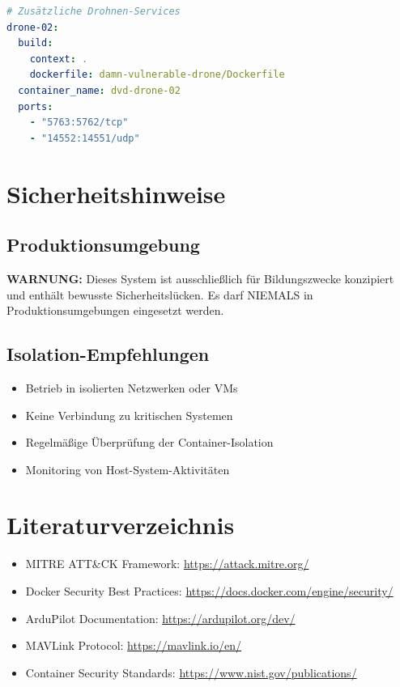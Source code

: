 \documentclass[11pt,a4paper]{article}
\begin{document}
\begin{lstlisting}[language=yaml, caption=Erweiterte Drohnen-Flotte]
# Zusätzliche Drohnen-Services
drone-02:
  build:
    context: .
    dockerfile: damn-vulnerable-drone/Dockerfile
  container_name: dvd-drone-02
  ports:
    - "5763:5762/tcp"
    - "14552:14551/udp"
\end{lstlisting}

\section{Sicherheitshinweise}

\subsection{Produktionsumgebung}

\textbf{WARNUNG:} Dieses System ist ausschließlich für Bildungszwecke konzipiert und enthält bewusste Sicherheitslücken. Es darf NIEMALS in Produktionsumgebungen eingesetzt werden.

\subsection{Isolation-Empfehlungen}

\begin{itemize}
    \item Betrieb in isolierten Netzwerken oder VMs
    \item Keine Verbindung zu kritischen Systemen
    \item Regelmäßige Überprüfung der Container-Isolation
    \item Monitoring von Host-System-Aktivitäten
\end{itemize}

\section{Literaturverzeichnis}

\begin{itemize}
    \item MITRE ATT\&CK Framework: \url{https://attack.mitre.org/}
    \item Docker Security Best Practices: \url{https://docs.docker.com/engine/security/}
    \item ArduPilot Documentation: \url{https://ardupilot.org/dev/}
    \item MAVLink Protocol: \url{https://mavlink.io/en/}
    \item Container Security Standards: \url{https://www.nist.gov/publications/}
\end{itemize}
\end{document}
